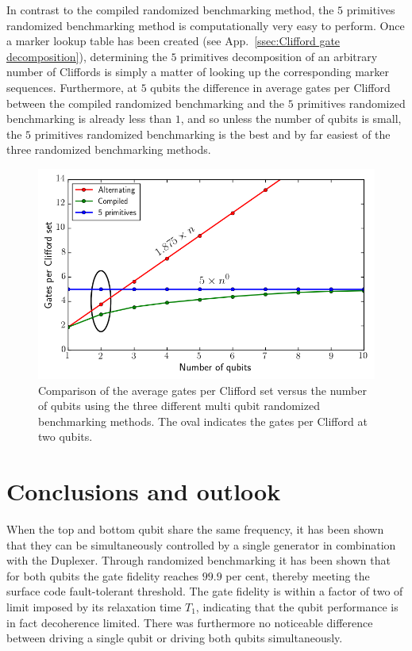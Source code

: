           In contrast to the compiled randomized benchmarking method, the $5$ primitives randomized benchmarking method is computationally very easy to perform. Once a marker lookup table has been created (see App.~\ref{ssec:Clifford gate decomposition}), determining the $5$ primitives decomposition of an arbitrary number of Cliffords is simply a matter of looking up the corresponding marker sequences. Furthermore, at $5$ qubits the difference in average gates per Clifford between the compiled randomized benchmarking and the $5$ primitives randomized benchmarking is already less than $1$, and so unless the number of qubits is small, the $5$ primitives randomized benchmarking is the best and by far easiest of the three randomized benchmarking methods.

          \begin{figure}[h]
            \centering
            \includegraphics[width=.8\textwidth]{Figures/Randomized benchmarking/Clifford_comparison.png}
            \caption{Comparison of the average gates per Clifford set versus the number of qubits using the three different multi qubit randomized benchmarking methods. The oval indicates the gates per Clifford at two qubits.}
            \label{fig:gate per Clifford versus qubits comparison}
          \end{figure}

  \chapter{Conclusions and outlook}

    When the top and bottom qubit share the same frequency, it has been shown that they can be simultaneously controlled by a single generator in combination with the Duplexer. Through randomized benchmarking it has been shown that for both qubits the gate fidelity reaches $99.9$ per cent, thereby meeting the surface code fault-tolerant threshold. The gate fidelity is within a factor of two of limit imposed by its relaxation time $T_1$, indicating that the qubit performance is in fact decoherence limited. There was furthermore no noticeable difference between driving a single qubit or driving both qubits simultaneously.


